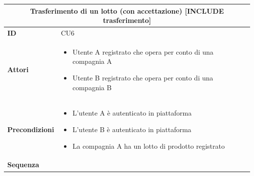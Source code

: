 \documentclass[a4paper,11pt]{article}
\begin{document}
\begin{longtable}{|p{2cm}|p{13cm}|}
  \multicolumn{2}{c}{\textbf{Trasferimento di un lotto (con accettazione) [INCLUDE trasferimento]}} \\ \hline
  \textbf{ID}              & CU6                                                                    \\ \hline
  \textbf{Attori}          &

  \begin{itemize}
    \item Utente A registrato che opera per conto di una compagnia A
    \item Utente B registrato che opera per conto di una compagnia B
  \end{itemize}

  \\ \hline
  \textbf{Precondizioni}   &

  \begin{itemize}
    \item L'utente A è autenticato in piattaforma
    \item L'utente B è autenticato in piattaforma
    \item La compagnia A ha un lotto di prodotto registrato
  \end{itemize}

  \\ \hline
  \textbf{Sequenza}        &


\end{longtable}
\end{document}
